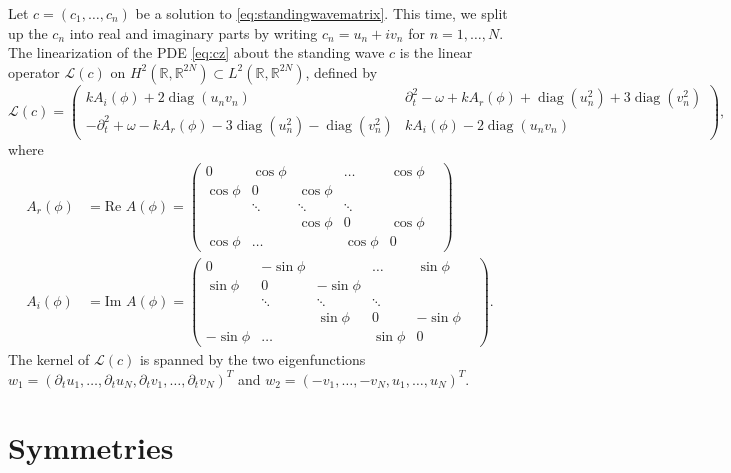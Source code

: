 \documentclass[11pt,reqno]{amsart}
\def\R{{\mathbb R}}
\def\calL{{\mathcal L}}
\DeclareMathOperator{\diag}{diag}
\begin{document}
Let $c = (c_1, \dots, c_n)$ be a solution to \cref{eq:standingwavematrix}. This time, we split up the $c_n$ into real and imaginary parts by writing $c_n = u_n + i v_n$ for $n = 1, \dots, N$. The linearization of the PDE \cref{eq:cz} about the standing wave $c$ is the linear operator $\calL(c)$ on $H^2(\R, \R^{2N}) \subset L^2(\R, \R^{2N})$, defined by 
\begin{equation}\label{eq:linc}
\calL(c) = \begin{pmatrix}
k A_i(\phi) + 2 \diag(u_n v_n) & \partial_t^2 - \omega + k A_r(\phi) + \diag(u_n^2) + 3 \diag(v_n^2) \\
-\partial_t^2 + \omega - k A_r(\phi) - 3\diag(u_n^2) - \diag(v_n^2) &
k A_i(\phi) - 2 \diag(u_n v_n)
\end{pmatrix},
\end{equation}
where
\begin{align*}
A_r(\phi) &= \text{Re } A(\phi) = \begin{pmatrix}
0 & \cos \phi & & \dots & \cos \phi \\
\cos \phi & 0 & \cos \phi & & & \\
& \ddots & \ddots & \ddots &  & \\
 & &\cos \phi  & 0 & \cos \phi  \\
\cos \phi& \dots & & \cos \phi & 0
\end{pmatrix} \\
A_i(\phi) &= \text{Im } A(\phi) = \begin{pmatrix}
0 & -\sin \phi & & \dots & \sin \phi \\
\sin \phi & 0 & -\sin \phi & & & \\
& \ddots & \ddots & \ddots &  & \\
 & &\sin \phi  & 0 & -\sin \phi  \\
-\sin \phi& \dots & & \sin \phi & 0
\end{pmatrix}.
\end{align*}
The kernel of $\calL(c)$ is spanned by the two eigenfunctions 
$w_1 = (\partial_t u_1, \dots, \partial_t u_N, \partial_t v_1, \dots, \partial_t v_N )^T$ and 
$w_2 = (-v_1, \dots, -v_N, u_1, \dots, u_N )^T$.

\appendix

\section{Symmetries}\label{app:symm}
\end{document}
